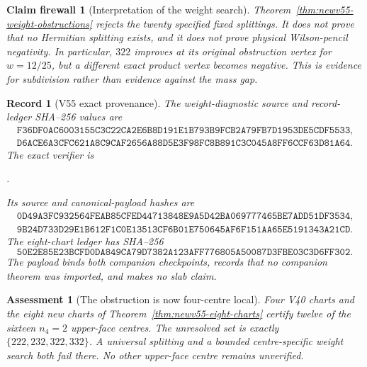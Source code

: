 \documentclass[11pt,oneside]{article}
\newtheorem{assessment}[theorem]{Assessment}
\newtheorem{firewall}[theorem]{Claim firewall}
\newtheorem{record}[theorem]{Record}
\theoremstyle{definition}
\theoremstyle{remark}
\begin{document}
\begin{firewall}[Interpretation of the weight search]
\label{fire:newv55-weight}
Theorem~\ref{thm:newv55-weight-obstructions} rejects the twenty
specified fixed splittings.  It does not prove that no Hermitian
splitting exists, and it does not prove physical Wilson-pencil
negativity.  In particular, \(322\) improves at its original
obstruction vertex for \(w=12/25\), but a different exact product
vertex becomes negative.  This is evidence for subdivision rather
than evidence against the mass gap.
\end{firewall}

\begin{record}[V55 exact provenance]
\label{rec:newv55-provenance}
The weight-diagnostic source and record-ledger SHA--256 values are
\[
\begin{gathered}
\texttt{F36DF0AC6003155C3C22CA2E6B8D191E1B793B9FCB2A79FB7D1953DE5CDF5533},\\
\texttt{D6ACE6A3CFC621A8C9CAF2656A88D5E3F98FC8B891C3C045A8FF6CCF63D81A64}.
\end{gathered}                                         \tag{55.10}
\]
The exact verifier is
\begin{center}
\footnotesize
{}.
\end{center}
Its source and canonical-payload hashes are
\[
\begin{gathered}
\texttt{0D49A3FC932564FEAB85CFED44713848E9A5D42BA069777465BE7ADD51DF3534},\\
\texttt{9B24D733D29E1B612F1C0E13513CF6B01E750645AF6F151AA65E5191343A21CD}.
\end{gathered}                                         \tag{55.11}
\]
The eight-chart ledger has SHA--256
\[
\texttt{50E2E85E23BCFD0DA849CA79D7382A123AFF776805A50087D3FBE03C3D6FF302}.
                                                               \tag{55.12}
\]
The payload binds both companion checkpoints, records that no
companion theorem was imported, and makes no slab claim.
\end{record}

\begin{assessment}[The obstruction is now four-centre local]
\label{ass:newv55}
Four V40 charts and the eight new charts of
Theorem~\ref{thm:newv55-eight-charts} certify twelve of the sixteen
\(n_4=2\) upper-face centres.  The unresolved set is exactly
\(\{222,232,322,332\}\).  A universal splitting and a bounded
centre-specific weight search both fail there.  No other upper-face
centre remains unverified.
\end{assessment}
\end{document}
